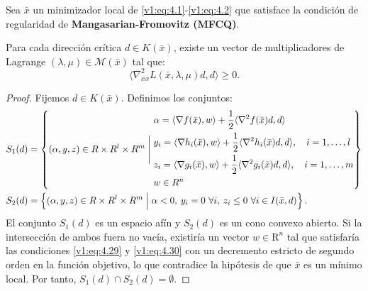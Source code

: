 \begin{theorem}\label{v1:thm:4.3.3}
 Sea $\bar{x}$ un minimizador local de \eqref{v1:eq:4.1}-\eqref{v1:eq:4.2} que satisface la condición de regularidad de \textbf{Mangasarian-Fromovitz (MFCQ)}.
 
 Para cada dirección crítica $d \in K(\bar{x})$, existe un vector de multiplicadores de Lagrange $(\lambda, \mu) \in \mathcal{M}(\bar{x})$ tal que:
 \begin{equation}
 \langle \nabla_{xx}^2 L(\bar{x}, \lambda, \mu)d, d \rangle \ge 0.
 \label{v1:eq:4.35}
 \end{equation}
\end{theorem}

\begin{proof}
 Fijemos $d \in K(\bar{x})$. Definimos los conjuntos:
 \begin{align*}
 S_1(d) &= \left\{ (\alpha, y, z) \in \R \times \R^l \times \R^m \mathrel{\Bigg|} \begin{aligned} &\alpha = \langle \nabla f(\bar{x}), w \rangle + \frac{1}{2}\langle \nabla^2 f(\bar{x})d, d \rangle \\ &y_i = \langle \nabla h_i(\bar{x}), w \rangle + \frac{1}{2}\langle \nabla^2 h_i(\bar{x})d, d \rangle, \quad i=1,\dots,l \\ &z_i = \langle \nabla g_i(\bar{x}), w \rangle + \frac{1}{2}\langle \nabla^2 g_i(\bar{x})d, d \rangle, \quad i=1,\dots,m \\ &w \in \Rn \end{aligned} \right\} \\
 S_2(d) &= \left\{ (\alpha, y, z) \in \R \times \R^l \times \R^m \mathrel{\Big|} \alpha < 0, \: y_i = 0 \ \forall i, \: z_i \le 0 \ \forall i \in I(\bar{x}, d) \right\}.
 \end{align*}
 El conjunto $S_1(d)$ es un espacio afín y $S_2(d)$ es un cono convexo abierto. Si la intersección de ambos fuera no vacía, existiría un vector $w \in \mathrm{R}^n$ tal que satisfaría las condiciones \eqref{v1:eq:4.29} y \eqref{v1:eq:4.30} con un decremento estricto de segundo orden en la función objetivo, lo que contradice la hipótesis de que $\bar{x}$ es un mínimo local. Por tanto, $S_1(d) \cap S_2(d) = \emptyset$.


\end{proof}
